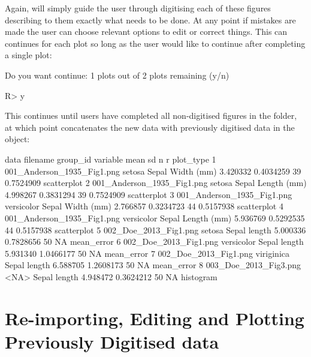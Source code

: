 \documentclass[article]{jss}
\newcommand{\fct}[1]{\code{#1()}}
\begin{document}
Again, \fct{metaDigitise} will simply guide the user through digitising each of these figures describing to them exactly what needs to be done. At any point if mistakes are made the user can choose relevant options to edit or correct things. This can continues for each plot so long as the user would like to continue after completing a single plot:

\begin{CodeChunk}
\begin{CodeOutput}
Do you want continue: 1 plots out of 2 plots remaining (y/n)
\end{CodeOutput}
\begin{CodeInput}
R> y
\end{CodeInput}
\end{CodeChunk}

This continues until users have completed all non-digitised figures in the folder, at which point \fct{metaDigitise} concatenates the new data with previously digitised data in the object:

\begin{CodeChunk}
\begin{CodeOutput}
data
               filename        group_id         variable     mean        sd   n         r    plot_type
1 001_Anderson_1935_Fig1.png     setosa  Sepal Width (mm) 3.420332 0.4034259 39 0.7524909 scatterplot
2 001_Anderson_1935_Fig1.png     setosa Sepal Length (mm) 4.998267 0.3831294 39 0.7524909 scatterplot
3 001_Anderson_1935_Fig1.png versicolor  Sepal Width (mm) 2.766857 0.3234723 44 0.5157938 scatterplot
4 001_Anderson_1935_Fig1.png versicolor Sepal Length (mm) 5.936769 0.5292535 44 0.5157938 scatterplot
5      002_Doe_2013_Fig1.png     setosa      Sepal length 5.000336 0.7828656 50        NA  mean_error
6      002_Doe_2013_Fig1.png versicolor      Sepal length 5.931340 1.0466177 50        NA  mean_error
7      002_Doe_2013_Fig1.png viriginica      Sepal length 6.588705 1.2608173 50        NA  mean_error
8      003_Doe_2013_Fig3.png       <NA>      Sepal length 4.948472 0.3624212 50        NA  histogram
\end{CodeOutput}
\end{CodeChunk}






\section{Re-importing, Editing and Plotting Previously Digitised data}
\end{document}
